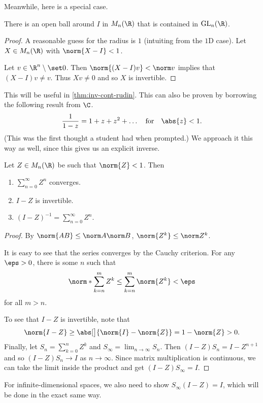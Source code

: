 Meanwhile, here is a special case.
\begin{lemma} \label{thm:gln-open-i}
    There is an open ball around $I$ in $M_n(\R)$
    that is contained in $\GL_n(\R)$.
\end{lemma}
\begin{proof}
    A reasonable guess for the radius is $1$ (intuiting from the $1$D case).
    Let $X \in M_n(\R)$ with $\norm{X - I} < 1$.

    Let $v \in \R^n \setminus \set 0$.
    Then $\norm{(X - I)v} < \norm v$ implies that $(X - I)v \ne v$.
    Thus $Xv \ne 0$ and so $X$ is invertible.
\end{proof}
This will be useful in \cref{thm:inv-cont-rudin}.
This can also be proven by borrowing the following result from $\C$. \[
    \frac1{1-z} = 1 + z + z^2 + \ldots \quad \text{for} \quad \abs{z} < 1.
\]
(This was the first thought a student had when prompted.)
We approach it this way as well, since this gives us an explicit inverse.
\begin{lemma*} \label{thm:inv-series}
    Let $Z \in M_n(\R)$ be such that $\norm{Z} < 1$.
    Then
    \begin{enumerate}
        \item $\sum_{n=0}^\infty Z^n$ converges.
        \item $I - Z$ is invertible.
        \item $(I - Z)^{-1} = \sum_{n=0}^\infty Z^n$.
    \end{enumerate}
\end{lemma*}
\begin{proof}
    By $\norm{AB} \le \norm A \norm B$, $\norm{Z^k} \le \norm Z^k$.

    It is easy to see that the series converges by the Cauchy criterion.
    For any $\eps > 0$, there is some $n$ such that \[
        \norm*{\sum_{k=n}^m Z^k} \le \sum_{k=n}^m \norm{Z^k} < \eps
    \]
    for all $m > n$.

    To see that $I - Z$ is invertible, note that \[
        \norm{I - Z} \ge \abs[\big]{\norm{I} - \norm{Z}} = 1 - \norm{Z} > 0.
    \]
    Finally, let $S_n = \sum_{k=0}^n Z^k$ and
    $S_\infty = \lim_{n \to \infty} S_n$.
    Then $(I - Z)S_n = I - Z^{n+1}$ and so
    $(I - Z)S_n \to I$ as $n \to \infty$.
    Since matrix multiplication is continuous, we can take the limit
    inside the product and get $(I - Z)S_\infty = I$.
\end{proof}
\begin{remark}
    For infinite-dimensional spaces, we also need to show
    $S_\infty (I - Z) = I$, which will be done in the exact same way.
\end{remark}

